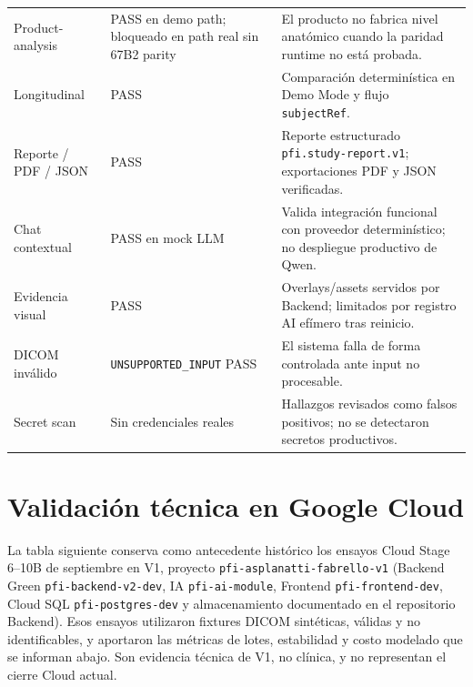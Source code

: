 {\begin{longtable}{>{\raggedright\arraybackslash}p{} >{\raggedright\arraybackslash}p{} >{\raggedright\arraybackslash}p{}}
Product-analysis & PASS en demo path; bloqueado en path real sin 67B2 parity & El producto no fabrica nivel anatómico cuando la paridad runtime no está probada. \\
Longitudinal & PASS & Comparación determinística en Demo Mode y flujo \texttt{subjectRef}. \\
Reporte / PDF / JSON & PASS & Reporte estructurado \texttt{pfi.study-report.v1}; exportaciones PDF y JSON verificadas. \\
Chat contextual & PASS en mock LLM & Valida integración funcional con proveedor determinístico; no despliegue productivo de Qwen. \\
Evidencia visual & PASS & Overlays/assets servidos por Backend; limitados por registro AI efímero tras reinicio. \\
DICOM inválido & 422 \texttt{UNSUPPORTED\_INPUT} PASS & El sistema falla de forma controlada ante input no procesable. \\
Secret scan & Sin credenciales reales & Hallazgos revisados como falsos positivos; no se detectaron secretos productivos. \\\hline
\end{longtable}
}

\section{Validación técnica en Google Cloud}
\label{sec:resultados-cloud-e2e}

La tabla siguiente conserva como antecedente histórico los ensayos Cloud Stage 6--10B de septiembre en V1, proyecto \texttt{pfi-asplanatti-fabrello-v1} (Backend Green \texttt{pfi-backend-v2-dev}, IA \texttt{pfi-ai-module}, Frontend \texttt{pfi-frontend-dev}, Cloud SQL \texttt{pfi-postgres-dev} y almacenamiento documentado en el repositorio Backend). Esos ensayos utilizaron fixtures DICOM sintéticas, válidas y no identificables, y aportaron las métricas de lotes, estabilidad y costo modelado que se informan abajo. Son evidencia técnica de V1, no clínica, y no representan el cierre Cloud actual.

